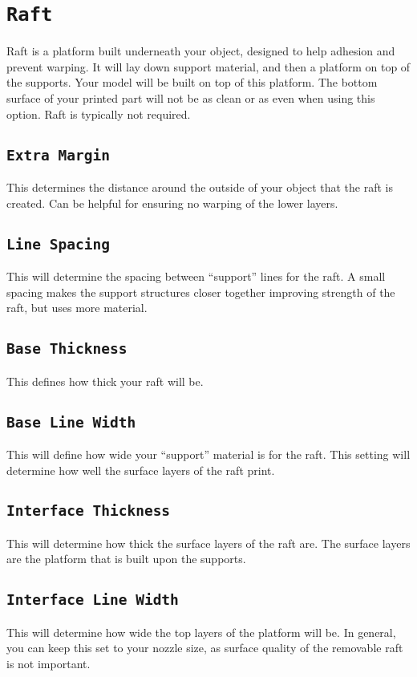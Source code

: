 \section{\texttt{Raft}}
Raft is a platform built underneath your object, designed to help adhesion and prevent warping. It will lay down support material, and then a platform on top of the supports. Your model will be built on top of this platform. The bottom surface of your printed part will not be as clean or as even when using this option. Raft is typically not required.

\subsection{\texttt{Extra Margin}}
This determines the distance around the outside of your object that the raft is created. Can be helpful for ensuring no warping of the lower layers.

\subsection{\texttt{Line Spacing}}
This will determine the spacing between “support” lines for the raft. A small spacing makes the support structures closer together improving strength of the raft, but uses more material.

\subsection{\texttt{Base Thickness}}
This defines how thick your raft will be.

\subsection{\texttt{Base Line Width}}
This will define how wide your “support” material is for the raft. This setting will determine how well the surface layers of the raft print.

\subsection{\texttt{Interface Thickness}}
This will determine how thick the surface layers of the raft are. The surface layers are the platform that is built upon the supports.

\subsection{\texttt{Interface Line Width}}
This will determine how wide the top layers of the platform will be. In general, you can keep this set to your nozzle size, as surface quality of the removable raft is not important.

